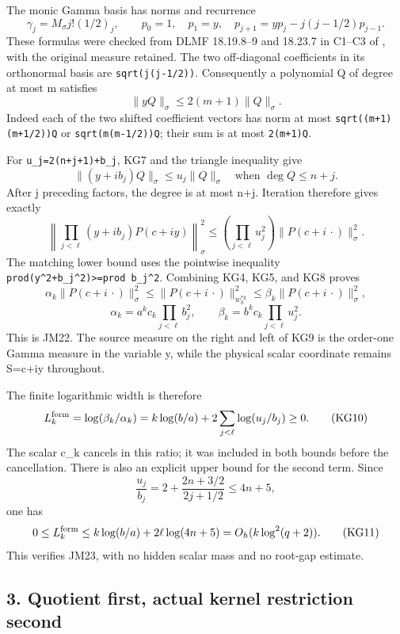 \documentclass[11pt]{article}
\begin{document}
The monic Gamma basis has norms and recurrence \[
\gamma_j=M_\sigma j!(1/2)_j,\qquad
p_0=1,\quad p_1=y,\quad
p_{j+1}=yp_j-j(j-1/2)p_{j-1}.
\tag{KG6}
\] These formulas were checked from DLMF 18.19.8--9 and 18.23.7 in C1--C3 of , with the original measure retained. The two off-diagonal coefficients in its orthonormal basis are \texttt{sqrt(j(j-1/2))}. Consequently a polynomial Q of degree at most m satisfies \[
\|yQ\|_\sigma\le2(m+1)\|Q\|_\sigma.
\tag{KG7}
\] Indeed each of the two shifted coefficient vectors has norm at most \texttt{sqrt((m+1)(m+1/2))\textbar{}\textbar{}Q\textbar{}\textbar{}} or \texttt{sqrt(m(m-1/2))\textbar{}\textbar{}Q\textbar{}\textbar{}}; their sum is at most \texttt{2(m+1)\textbar{}\textbar{}Q\textbar{}\textbar{}}.

For \texttt{u\_j=2(n+j+1)+b\_j}, KG7 and the triangle inequality give \[
\|(y+ib_j)Q\|_\sigma\le u_j\|Q\|_\sigma
\quad\text{when }\deg Q\le n+j.
\] After j preceding factors, the degree is at most n+j. Iteration therefore gives exactly \[
\left\|\prod_{j<\ell}(y+ib_j)P(c+iy)\right\|_\sigma^2
\le\left(\prod_{j<\ell}u_j^2\right)
\|P(c+i\,\cdot)\|_\sigma^2.
\tag{KG8}
\] The matching lower bound uses the pointwise inequality \texttt{prod(y\^{}2+b\_j\^{}2)\textgreater{}=prod\ b\_j\^{}2}. Combining KG4, KG5, and KG8 proves \[
\boxed{\alpha_k\|P(c+i\,\cdot)\|_\sigma^2
\le\|P(c+i\,\cdot)\|_{w_h^{*k}}^2
\le\beta_k\|P(c+i\,\cdot)\|_\sigma^2,}
\tag{KG9}
\] \[
\alpha_k=a^kc_k\prod_{j<\ell}b_j^2,\qquad
\beta_k=b^kc_k\prod_{j<\ell}u_j^2.
\] This is JM22. The source measure on the right and left of KG9 is the order-one Gamma measure in the variable y, while the physical scalar coordinate remains S=c+iy throughout.

The finite logarithmic width is therefore \[
L_k^{\rm form}=\log(\beta_k/\alpha_k)
=k\log(b/a)+2\sum_{j<\ell}\log(u_j/b_j)\ge0.
\tag{KG10}
\] The scalar c\_k cancels in this ratio; it was included in both bounds before the cancellation. There is also an explicit upper bound for the second term. Since \[
\frac{u_j}{b_j}=2+\frac{2n+3/2}{2j+1/2}\le4n+5,
\] one has \[
0\le L_k^{\rm form}\le k\log(b/a)+2\ell\log(4n+5)
=O_h(k\log^2(q+2)).
\tag{KG11}
\] This verifies JM23, with no hidden scalar mass and no root-gap estimate.

\subsection{3. Quotient first, actual kernel restriction second}\label{mrkg:quotient-first-actual-kernel-restriction-second}
\end{document}
